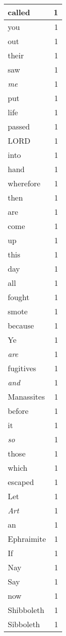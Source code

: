 \begin{center}
\begin{longtable}{l|r}
called & 1\\ \hline 
you & 1\\ \hline 
out & 1\\ \hline 
their & 1\\ \hline 
saw & 1\\ \hline 
\emph{me} & 1\\ \hline 
put & 1\\ \hline 
life & 1\\ \hline 
passed & 1\\ \hline 
LORD & 1\\ \hline 
into & 1\\ \hline 
hand & 1\\ \hline 
wherefore & 1\\ \hline 
then & 1\\ \hline 
are & 1\\ \hline 
come & 1\\ \hline 
up & 1\\ \hline 
this & 1\\ \hline 
day & 1\\ \hline 
all & 1\\ \hline 
fought & 1\\ \hline 
smote & 1\\ \hline 
because & 1\\ \hline 
Ye & 1\\ \hline 
\emph{are} & 1\\ \hline 
fugitives & 1\\ \hline 
\emph{and} & 1\\ \hline 
Manassites & 1\\ \hline 
before & 1\\ \hline 
it & 1\\ \hline 
\emph{so} & 1\\ \hline 
those & 1\\ \hline 
which & 1\\ \hline 
escaped & 1\\ \hline 
Let & 1\\ \hline 
\emph{Art} & 1\\ \hline 
an & 1\\ \hline 
Ephraimite & 1\\ \hline 
If & 1\\ \hline 
Nay & 1\\ \hline 
Say & 1\\ \hline 
now & 1\\ \hline 
Shibboleth & 1\\ \hline 
Sibboleth & 1\\ \hline 

\end{longtable}
\end{center}
